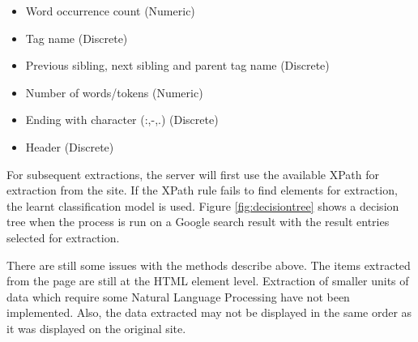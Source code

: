 	\begin{itemize}
		\item Word occurrence count (Numeric)
		\item Tag name (Discrete)
		\item Previous sibling, next sibling and parent tag name (Discrete)
		\item Number of words/tokens (Numeric)
		\item Ending with character (:,-,.) (Discrete)
		\item Header (Discrete)
	\end{itemize}
	
	For subsequent extractions, the server will first use the available XPath for extraction from the site. If the XPath rule fails to find elements for extraction, the learnt classification model is used. Figure \ref{fig:decisiontree} shows a decision tree when the process is run on a Google search result with the result entries selected for extraction.
	
	
	There are still some issues with the methods describe above. The items extracted from the page are still at the HTML element level. Extraction of smaller units of data which require some Natural Language Processing have not been implemented. Also, the data extracted may not be displayed in the same order as it was displayed on the original site.
